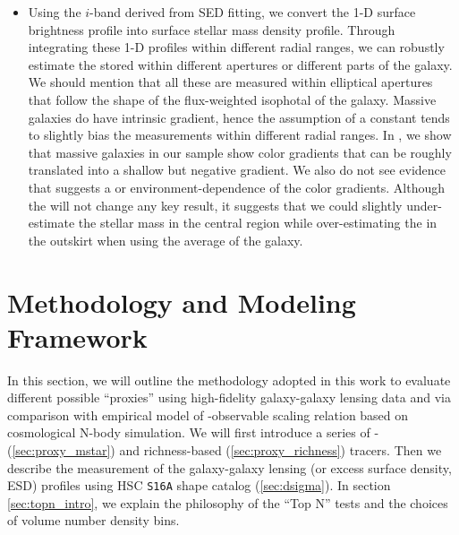 \documentclass[a4paper,fleqn,usenatbib]{mnras}
\begin{document}
\begin{itemize}
		\item Using the $i$-band \mlratio{} derived from SED fitting, we convert the
			1-D surface brightness profile into surface stellar mass density profile.
            Through integrating these 1-D profiles within different radial ranges, we
            can robustly estimate the \mstar{} stored within different apertures or
            different parts of the galaxy.
            We should mention that all these \mstar{} are measured within elliptical
            apertures that follow the shape of the flux-weighted isophotal of the galaxy.
            Massive galaxies do have intrinsic \mlratio{} gradient, hence the assumption of
            a constant \mlratio{} tends to slightly bias the \mstar{} measurements within
            different radial ranges.
            In \citet{Huang2018b}, we show that massive galaxies in our sample show
            color gradients that can be roughly translated into a shallow but negative
            \mlratio{} gradient.
            We also do not see evidence that suggests a \mstar{} or environment-dependence
            of the color gradients.
            Although the \mlratio{} will not change any key result, it suggests that we
            could slightly under-estimate the stellar mass in the central region while
            over-estimating the \mstar{} in the outskirt when using the average \mlratio{}
            of the galaxy.

	\end{itemize}


\section{Methodology and Modeling Framework}
    \label{sec:method}

    In this section, we will outline the methodology adopted in this work to evaluate different
    possible \mvir{} ``proxies'' using high-fidelity galaxy-galaxy lensing data and via
    comparison with empirical model of \mvir{}-observable scaling relation based on cosmological
    N-body simulation.
    We will first introduce a series of \mstar{}- (\ref{sec:proxy_mstar}) and richness-based
    (\ref{sec:proxy_richness}) \mvir{} tracers.
    Then we describe the measurement of the galaxy-galaxy lensing \dsigma{} (or excess surface
    density, ESD) profiles using HSC \texttt{S16A} shape catalog (\ref{sec:dsigma}).
    In section \ref{sec:topn_intro}, we explain the philosophy of the ``Top N'' tests and the
    choices of volume number density bins. 
\end{document}
